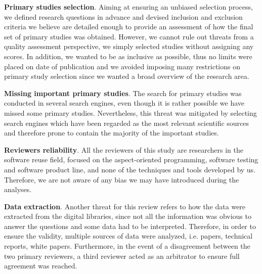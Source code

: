 \textbf{Primary studies selection}. Aiming at ensuring an unbiased selection process, we defined research questions in advance and devised inclusion and exclusion criteria we believe are detailed enough to provide an assessment of how the final set of primary studies was obtained. However, we cannot rule out threats from a quality assessment perspective, we simply selected studies without assigning any scores. In addition, we wanted to be as inclusive as possible, thus no limits were placed on date of publication and we avoided imposing many restrictions on primary study selection since we wanted a broad overview of the research area.

\textbf{Missing important primary studies}. The search for primary studies was conducted in several search engines, even though it is rather possible we have missed some primary studies. Nevertheless, this threat was mitigated by selecting search engines which have been regarded as the most relevant scientific sources~\cite{Dyba} and therefore prone to contain the majority of the important studies.

\textbf{Reviewers reliability}. All the reviewers of this study are researchers in the software reuse field, focused on the aspect-oriented programming, software testing and software product line, and none of the techniques and tools developed by us. Therefore, we are not aware of any bias we may have introduced during the analyses.

\textbf{Data extraction}. Another threat for this review refers to how the data were extracted from the digital libraries, since not all the information was obvious to answer the questions and some data had to be interpreted. Therefore, in order to ensure the validity, multiple sources of data were analyzed, i.e. papers, technical reports, white papers. Furthermore, in the event of a disagreement between the two primary reviewers, a third reviewer acted as an arbitrator to ensure full agreement was reached.